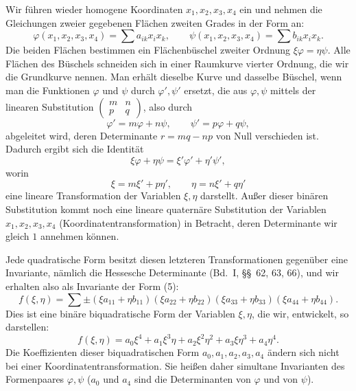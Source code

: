 \documentclass[11pt]{article}
\begin{document}
Wir führen wieder homogene Koordinaten $x_1,x_2,x_3,x_4$ ein und nehmen die Gleichungen zweier gegebenen Flächen zweiten Grades in der Form an:
\begin{equation}
\varphi(x_1,x_2,x_3,x_4)=\sum a_{ik}x_i x_k,\qquad
\psi(x_1,x_2,x_3,x_4)=\sum b_{ik}x_i x_k.
\tag{3}
\end{equation}
Die beiden Flächen bestimmen ein Flächenbüschel zweiter Ordnung $\xi\varphi=\eta\psi$. Alle Flächen des Büschels schneiden sich in einer Raumkurve vierter Ordnung, die wir die Grundkurve nennen. Man erhält dieselbe Kurve und dasselbe Büschel, wenn man die Funktionen $\varphi$ und $\psi$ durch $\varphi',\psi'$ ersetzt, die aus $\varphi,\psi$ mittels der linearen Substitution $\begin{pmatrix}m&n\\ p&q\end{pmatrix}$, also durch
\begin{equation}
\varphi'=m\varphi+n\psi,\qquad
\psi'=p\varphi+q\psi,
\tag{4}
\end{equation}
abgeleitet wird, deren Determinante $r=mq-np$ von Null verschieden ist. Dadurch ergibt sich die Identität
\begin{equation}
\xi\varphi+\eta\psi=\xi'\varphi'+\eta'\psi',
\tag{5}
\end{equation}
worin
\begin{equation}
\xi=m\xi'+p\eta',\qquad \eta=n\xi'+q\eta'
\tag{6}
\end{equation}
eine lineare Transformation der Variablen $\xi,\eta$ darstellt. Außer dieser binären Substitution kommt noch eine lineare quaternäre Substitution der Variablen $x_1,x_2,x_3,x_4$ (Koordinatentransformation) in Betracht, deren Determinante wir gleich $1$ annehmen können.

Jede quadratische Form besitzt diesen letzteren Transformationen gegenüber eine Invariante, nämlich die Hessesche Determinante (Bd.~I, \S\S~62, 63, 66), und wir erhalten also als Invariante der Form (5):
\begin{equation}
f(\xi,\eta)=\sum\pm(\xi a_{11}+\eta b_{11})(\xi a_{22}+\eta b_{22})(\xi a_{33}+\eta b_{33})(\xi a_{44}+\eta b_{44}).
\tag{7}
\end{equation}
Dies ist eine binäre biquadratische Form der Variablen $\xi,\eta$, die wir, entwickelt, so darstellen:
\begin{equation}
f(\xi,\eta)=a_0\xi^4+a_1\xi^3\eta+a_2\xi^2\eta^2+a_3\xi\eta^3+a_4\eta^4.
\tag{8}
\end{equation}
Die Koeffizienten dieser biquadratischen Form $a_0,a_1,a_2,a_3,a_4$ ändern sich nicht bei einer Koordinatentransformation. Sie heißen daher simultane Invarianten des Formenpaares $\varphi,\psi$ ($a_0$ und $a_4$ sind die Determinanten von $\varphi$ und von $\psi$).
\end{document}
